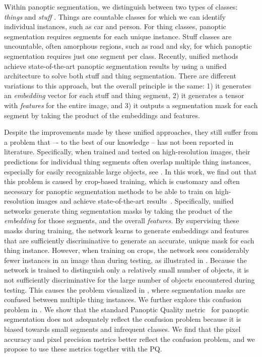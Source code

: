 \documentclass[10pt,twocolumn,letterpaper]{article}
\begin{document}
Within panoptic segmentation, we distinguish between two types of classes: \textit{things} and \textit{stuff} \cite{kirillov2019ps}. Things are countable classes for which we can identify individual instances, such as car and person. For thing classes, panoptic segmentation requires segments for each unique instance. Stuff classes are uncountable, often amorphous regions, such as road and sky, for which panoptic segmentation requires just one segment per class. Recently, unified methods achieve state-of-the-art panoptic segmentation results by using a unified architecture to solve both stuff and thing segmentation. There are different variations to this approach, but the overall principle is the same: 1) it generates an \textit{embedding} vector for each stuff and thing segment, 2) it generates a tensor with \textit{features} for the entire image, and 3) it outputs a segmentation mask for each segment by taking the product of the embeddings and features.


Despite the improvements made by these unified approaches, they still suffer from a problem that –- to the best of our knowledge -- has not been reported in literature. Specifically, when trained and tested on high-resolution images, their predictions for individual thing segments often overlap multiple thing instances, especially for easily recognizable large objects, see . In this work, we find out that this problem is caused by crop-based training, which is customary and often necessary for panoptic segmentation methods to be able to train on high-resolution images and achieve state-of-the-art results~\cite{porzi2021allscales}. Specifically, unified networks generate thing segmentation masks by taking the product of the \textit{embedding} for those segments, and the overall \textit{features}. By supervising these masks during training, the network learns to generate embeddings and features that are sufficiently discriminative to generate an accurate, unique mask for each thing instance. However, when training on crops, the network sees considerably fewer instances in an image than during testing, as illustrated in . Because the network is trained to distinguish only a relatively small number of objects, it is not sufficiently discriminative for the large number of objects encountered during testing. This causes the problem visualized in , where segmentation masks are confused between multiple thing instances. We further explore this confusion problem in . We show that the standard Panoptic Quality metric~\cite{kirillov2019ps} for panoptic segmentation does not adequately reflect the confusion problem because it is biased towards small segments and infrequent classes. We find that the pixel accuracy and pixel precision metrics  better reflect the confusion problem, and we propose to use these metrics together with the PQ.
\end{document}
